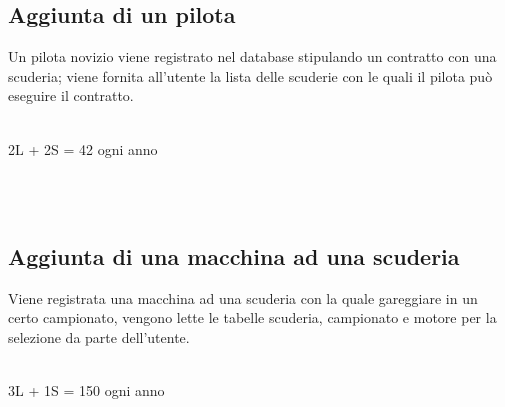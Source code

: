 \documentclass[a4paper,12pt]{report}
\begin{document}
			\subsection{Aggiunta di un pilota}
			{\fontsize{12.5}{20}\selectfont
			Un pilota novizio viene registrato nel database stipulando un contratto con una scuderia;
			viene fornita all'utente la lista delle scuderie con le quali il pilota può eseguire il contratto.}
			\begin{table}[!htb]
				\centering
				\begin{center}
				\newline\\
				2L + 2S = 42 ogni anno\\
				\end{center}
			\end{table}\\\\
			\subsection{Aggiunta di una macchina ad una scuderia}
			{\fontsize{12.5}{20}\selectfont
			Viene registrata una macchina ad una scuderia con la quale gareggiare in un certo campionato,
			vengono lette le tabelle scuderia, campionato e motore per la selezione da parte dell'utente.}
			\begin{table}[!htb]
				\centering
				\begin{center}
				\newline\\
				3L + 1S = 150 ogni anno\\
				\end{center}
			\end{table}\\
			\pagebreak
\end{document}
